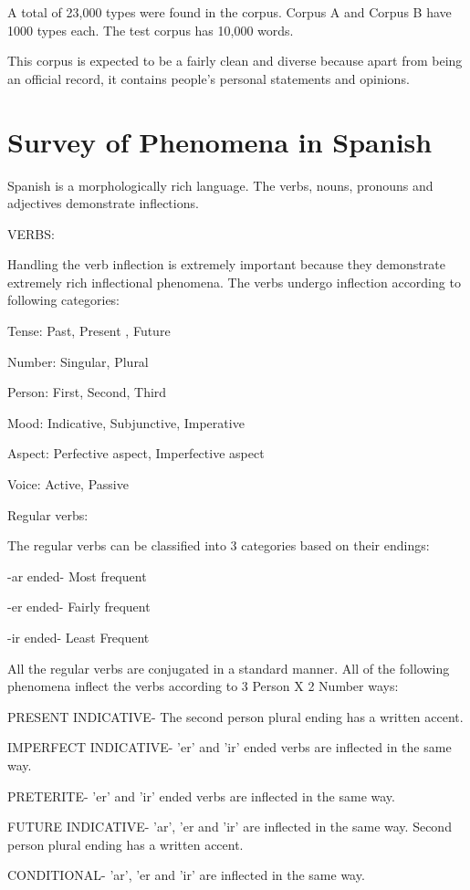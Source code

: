 \documentclass[11pt,letterpaper]{article}
\begin{document}
A total of 23,000 types were found in the corpus. Corpus A and Corpus B have 1000 types each. The test corpus has 10,000 words.

This corpus is expected to be a fairly clean and diverse because apart from being an official record, it contains people's personal statements and opinions.


\section{Survey of Phenomena in Spanish}

Spanish is a morphologically rich language. The verbs, nouns, pronouns and adjectives demonstrate inflections.


VERBS:

Handling the verb inflection is extremely important because they demonstrate extremely rich inflectional phenomena.
The verbs undergo inflection according to following categories:

Tense: Past, Present , Future

Number: Singular, Plural

Person: First, Second, Third

Mood: Indicative, Subjunctive, Imperative

Aspect: Perfective aspect, Imperfective aspect

Voice: Active, Passive

Regular verbs:

The regular verbs can be classified into 3 categories based on their endings:

	-ar ended- Most frequent

	-er ended- Fairly frequent

	-ir ended- Least Frequent

All the regular verbs are conjugated in a standard manner. All of the following phenomena inflect the verbs according to 3 Person X 2 Number ways:

PRESENT INDICATIVE- The second person plural ending has a written accent.

IMPERFECT INDICATIVE- 'er' and 'ir' ended verbs are inflected in the same way.

PRETERITE- 'er' and 'ir' ended verbs are inflected in the same way.

FUTURE INDICATIVE- 'ar', 'er and 'ir' are inflected in the same way. Second person plural ending has a written accent.

CONDITIONAL- 'ar', 'er and 'ir' are inflected in the same way.
\end{document}

